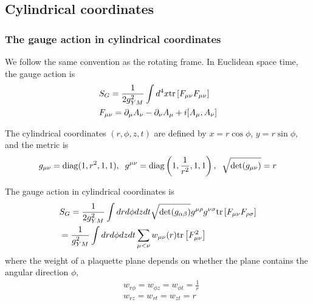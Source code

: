 \subsection{\label{sec:Cylinder}Cylindrical coordinates}

\subsubsection{\label{sec:CylinderGaugeAction}The gauge action in cylindrical coordinates}

We follow the same convention as the rotating frame. In Euclidean space time, the gauge action is
\begin{equation}
\begin{split}
&S_G=\frac{1}{2g_{YM}^2}\int d^4x {\rm tr}\left[F_{\mu\nu}F_{\mu\nu}\right]\\
&F_{\mu\nu}=\partial _{\mu}A_{\nu}-\partial _{\nu}A_{\mu}+i[A_{\mu},A_{\nu}]\\
\end{split}
\end{equation}

The cylindrical coordinates $(r,\phi,z,t)$ are defined by $x=r\cos\phi$, $y=r\sin\phi$, and the metric is
\begin{equation}
\begin{split}
&g_{\mu\nu}={\rm diag}(1,r^2,1,1),\;\;g^{\mu\nu}={\rm diag}\left(1,\frac{1}{r^2},1,1\right),\;\;\sqrt{\det (g_{\mu\nu})}=r\\
\end{split}
\end{equation}

The gauge action in cylindrical coordinates is
\begin{equation}
\begin{split}
&S_G=\frac{1}{2g_{YM}^2}\int drd\phi dzdt \sqrt{\det (g_{\alpha\beta})}g^{\mu\rho}g^{\nu\sigma}{\rm tr}\left[F_{\mu\nu}F_{\rho\sigma}\right]\\
&=\frac{1}{g_{YM}^2}\int drd\phi dzdt \sum _{\mu<\nu} w_{\mu\nu}(r) {\rm tr}\left[F_{\mu\nu}^2\right]\\
\end{split}
\end{equation}
where the weight of a plaquette plane depends on whether the plane contains the angular direction $\phi$,
\begin{equation}
\begin{split}
&w_{r\phi}=w_{\phi z}=w_{\phi t}=\frac{1}{r}\\
&w_{rz}=w_{rt}=w_{zt}=r\\
\end{split}
\end{equation}

